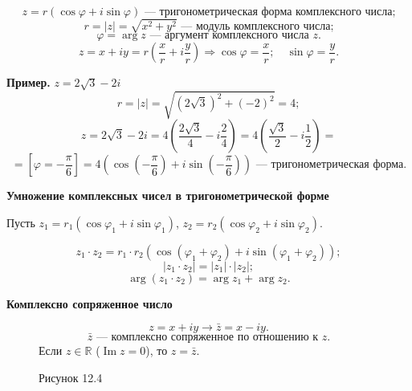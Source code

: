 \documentclass[12pt,a4paper]{article}
\begin{document}
$$
z=r(\cos\varphi+i\sin\varphi) \text{ --- тригонометрическая форма
комплексного числа;}
$$
$$
r=|z|=\sqrt{x^2+y^2} \text{ --- модуль комплексного числа;}
$$
$$
\varphi=\arg z \text{ --- аргумент комплексного числа } z.
$$
$$
z=x+iy=r\left(\frac{x}{r}+i\frac{y}{r}\right)\Rightarrow
\cos\varphi=\frac{x}{r};\quad \sin\varphi=\frac{y}{r}.
$$

\textbf{Пример.} $z=2\sqrt3-2i$
$$
r=|z|=\sqrt{(2\sqrt3)^2+(-2)^2}=4;
$$
$$
z=2\sqrt3-2i=4\left(\frac{2\sqrt3}{4}-i\frac{2}{4}\right)=4\left(\frac{\sqrt3}{2}-i\frac12\right)=
$$
$$
=\left[\varphi=-\frac{\pi}{6}\right]=4\left(\cos\left(-\frac{\pi}{6}\right)+i\sin\left(-\frac{\pi}{6}\right)\right)
\text{ --- тригонометрическая форма.}
$$

\textbf{Умножение комплексных чисел в тригонометрической форме}

Пусть $z_1=r_1(\cos\varphi_1+i\sin\varphi_1)$,
$z_2=r_2(\cos\varphi_2+i\sin\varphi_2)$.

\begin{equation}
  z_1\cdot z_2=r_1\cdot
  r_2\left(\cos(\varphi_1+\varphi_2)+i\sin(\varphi_1+\varphi_2)\right);
  \tag{12.1}
\end{equation}
$$
|z_1\cdot z_2|=|z_1|\cdot |z_2|;
$$
$$
\arg(z_1\cdot z_2)=\arg z_1+\arg z_2.
$$

\textbf{Комплексно сопряженное число}

\begin{figure}[H]
  \centering
  \begin{minipage}{0.45\textwidth}
    $$
    z=x+iy\to \bar z=x-iy.
    $$
    $$
    \bar z \text{ --- комплексно сопряженное по отношению к } z.
    $$
    Если $z\in\mathbb R$ ($\operatorname{Im}z=0$), то $z=\bar z$.
  \end{minipage}%
  \begin{minipage}{0.45\textwidth}
    \centering
    \caption*{Рисунок 12.4}
  \end{minipage}
\end{figure}
\end{document}
